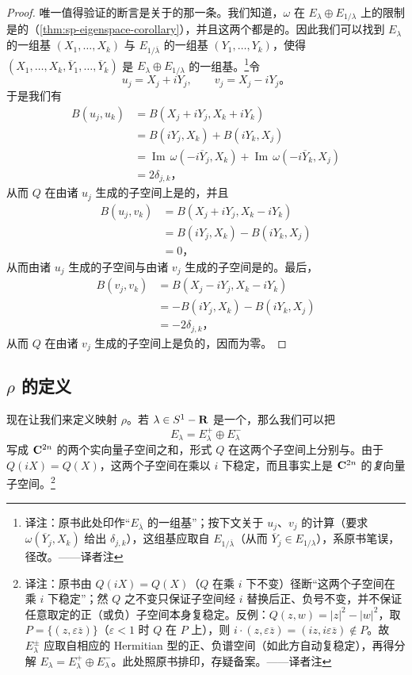 \begin{proof}
唯一值得验证的断言是关于\trSignature{}的那一条。我们知道，$\omega$ 在 $E_\lambda\oplus E_{1/\lambda}$ 上的限制是\trNondegenerate{}的（\cref{thm:sp-eigenspace-corollary}），并且这两个\trGeneralizedEigenspace{}都是\trIsotropic{}的。因此我们可以找到 $E_\lambda$ 的一组基 $(X_1,\dotsc,X_k)$ 与 $E_{1/\overline{\lambda}}$ 的一组基 $(Y_1,\dotsc,Y_k)$，使得 $(X_1,\dotsc,X_k,\overline{Y}_1,\dotsc,\overline{Y}_k)$ 是 $E_\lambda\oplus E_{1/\lambda}$ 的一组\trSymplectic{}基。\footnote{译注：原书此处印作“$E_{\overline{\lambda}}$ 的一组基”；按下文关于 $u_j$、$v_j$ 的计算（要求 $\omega(\overline{Y}_j,X_k)$ 给出 $\delta_{j,k}$），这组基应取自 $E_{1/\overline{\lambda}}$（从而 $\overline{Y}_j\in E_{1/\lambda}$），系原书笔误，径改。——译者注}令
\[
u_j=X_j+iY_j,\qquad v_j=X_j-iY_j\text{。}
\]
于是我们有
\[
\begin{aligned}
B(u_j,u_k)&=B(X_j+iY_j,X_k+iY_k)\\
&=B(iY_j,X_k)+B(iY_k,X_j)\\
&=\operatorname{Im}\,\omega(-i\overline{Y}_j,X_k)+\operatorname{Im}\,\omega(-i\overline{Y}_k,X_j)\\
&=2\delta_{j,k}\text{，}
\end{aligned}
\]
从而 $Q$ 在由诸 $u_j$ 生成的子空间上是\trPositiveDefinite{}的，并且
\[
\begin{aligned}
B(u_j,v_k)&=B(X_j+iY_j,X_k-iY_k)\\
&=B(iY_j,X_k)-B(iY_k,X_j)\\
&=0\text{，}
\end{aligned}
\]
从而由诸 $u_j$ 生成的子空间与由诸 $v_j$ 生成的子空间是\trOrthogonal{}的。最后，
\[
\begin{aligned}
B(v_j,v_k)&=B(X_j-iY_j,X_k-iY_k)\\
&=-B(iY_j,X_k)-B(iY_k,X_j)\\
&=-2\delta_{j,k}\text{，}
\end{aligned}
\]
从而 $Q$ 在由诸 $v_j$ 生成的子空间上是负的，因而\trSignature{}为零。
\end{proof}

\subsection{$\rho$ 的定义}
\label{subsec:rho-definition}

现在让我们来定义映射 $\rho$。若 $\lambda\in S^1-\mathbf{R}$ 是一个\trEigenvalue，那么我们可以把\trGeneralizedEigenspace
\[
E_\lambda=E_\lambda^+\oplus E_\lambda^-
\]
写成 $\mathbf{C}^{2n}$ 的两个实向量子空间之和，形式 $Q$ 在这两个子空间上分别\trPositiveDefinite{}与\trNegativeDefinite{}。由于 $Q(iX)=Q(X)$，这两个子空间在乘以 $i$ 下稳定，而且事实上是 $\mathbf{C}^{2n}$ 的\emph{复}向量子空间。\footnote{译注：原书由 $Q(iX)=Q(X)$（$Q$ 在乘 $i$ 下不变）径断“这两个子空间在乘 $i$ 下稳定”；然 $Q$ 之不变只保证子空间经 $i$ 替换后正、负号不变，并不保证任意取定的正（或负）子空间本身复稳定。反例：$Q(z,w)=|z|^{2}-|w|^{2}$，取 $P=\{(z,\varepsilon\overline{z})\}$（$\varepsilon<1$ 时 $Q$ 在 $P$ 上\trPositiveDefinite），则 $i\cdot(z,\varepsilon\overline{z})=(iz,i\varepsilon\overline{z})\notin P$。故 $E_\lambda^{\pm}$ 应取自相应的 Hermitian 型的正、负谱空间（如此方自动复稳定），再得分解 $E_\lambda=E_\lambda^{+}\oplus E_\lambda^{-}$。此处照原书排印，存疑备案。——译者注}

